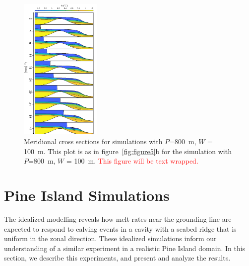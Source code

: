 \documentclass[draft]{agujournal2019}
\newcommand{\red}[1]{\textcolor{red}{#1}}
\begin{document}
\begin{figure}
    \centering
    \includegraphics[width = 0.35\textwidth]{../make_figures/plots/figure9_axislabel.pdf}
    \caption{Meridional cross sections for simulations with $P$=800~m, $W$ = 100~m. This plot is as in figure~\ref{fig:figure5}b for the simulation with $P$=800~m, $W$ = 100~m.  \red{This figure will be text wrapped.} }
    \label{fig:figure9}
\end{figure}

\section{Pine Island Simulations}
The idealized modelling reveals how melt rates near the grounding line are expected to respond to calving events in a cavity with a seabed ridge that is uniform in the zonal direction. These idealized simulations inform our understanding of a similar experiment in a realistic Pine Island domain. In this section, we describe this experiments, and present and analyze the results.
\end{document}

